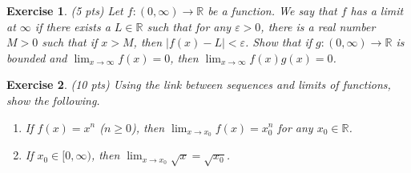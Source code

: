 \documentclass[12pt]{article}
\newcommand{\bR}{\mathbb{R}}
\newcommand{\ra}{\rightarrow}
\theoremstyle{plain}
\newtheorem{exer}{\textbf{Exercise}}}
\theoremstyle{plain}
\begin{document}
\begin{exer}
(5 pts)
Let $f : (0, \infty ) \ra \bR$ be a function. We say that $f$ has a limit at $\infty$ if there exists a $L \in \bR$ such that for any $\varepsilon > 0$, there is a real number $M > 0$ such that if $x > M$, then $|f(x) - L| < \varepsilon$. Show that if $g: (0, \infty ) \ra \bR$ is bounded and $\lim_{x \ra \infty} f(x ) = 0$, then $\lim_{x \ra \infty} f(x) g(x) = 0$.
\end{exer}

\begin{exer}
(10 pts)
Using the link between sequences and limits of functions, show the following.
	\begin{enumerate}
	\item If $f(x) = x^n$ ($n \geq 0$), then $\lim_{x \ra x_0} f(x) = x_0^n$ for any $x_0 \in \bR$.
	\item If $x_0 \in [0, \infty )$, then $\lim_{x \ra x_0} \sqrt{x} = \sqrt{x_0}$.
\end{enumerate}	 
\end{exer}
\end{document}
